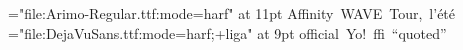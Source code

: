 \font\ar="file:Arimo-Regular.ttf:mode=harf" at 11pt
\hbox{\ar Affinity WAVE Tour, l'été}
\font\dj="file:DejaVuSans.ttf:mode=harf;+liga" at 9pt
\hbox{\dj official Yo! ffi “quoted”}
